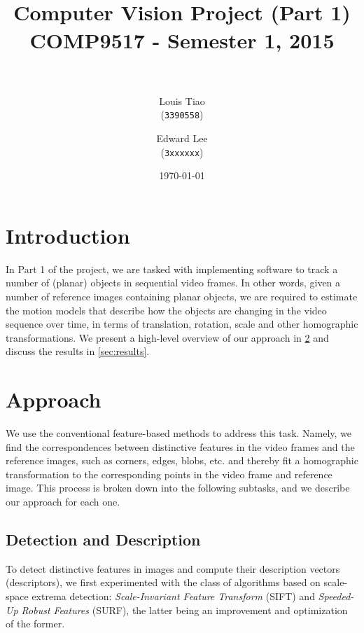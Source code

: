 \documentclass[11pt]{article} %
\title{	
\normalfont \normalsize 
\horrule{0.5pt} \\[0.4cm] %
\Large Computer Vision Project (Part 1) \\ [0.1cm] %
\large COMP9517 - Semester 1, 2015 \\ [0.2cm]
\horrule{2pt} \\[0.5cm] %
}
\author{
	Louis Tiao \\
	(\texttt{3390558})
	\and
	Edward Lee\\
	(\texttt{3xxxxxx})
} %
\date{\normalsize\today} %
\theoremstyle{plain}
\theoremstyle{definition}
\theoremstyle{remark}
\numberwithin{equation}{section} %
\numberwithin{figure}{section} %
\numberwithin{table}{section} %
\begin{document}
\maketitle %


\the\columnwidth

\section{Introduction}

In Part 1 of the project, we are tasked with implementing software to track a number 
of (planar) objects in sequential video frames. In other words, given a number of 
reference images containing planar objects, we are required to estimate the motion 
models that describe how the objects are changing in the video sequence over time, 
in terms of translation, rotation, scale and other homographic transformations. We 
present a high-level overview of our approach in \cref{sec:approach} and discuss the 
results in \cref{sec:results}.

\section{Approach} \label{sec:approach}

We use the conventional feature-based methods to address this task. Namely, we find
the correspondences between distinctive features in the video frames and the reference 
images, such as corners, edges, blobs, etc. and thereby fit a homographic transformation 
to the corresponding points in the video frame and reference image. This process is
broken down into the following subtasks, and we describe our approach for each one.

\subsection{Detection and Description}


To detect distinctive features in images and compute their description vectors 
(descriptors), we first experimented with the class of algorithms based on scale-space 
extrema detection: \emph{Scale-Invariant Feature Transform} \citep{Lowe2004} (SIFT) and 
\emph{Speeded-Up Robust Features} \citep{Bay2008} (SURF), the latter being an improvement 
and optimization 
of the former. 
\end{document}
